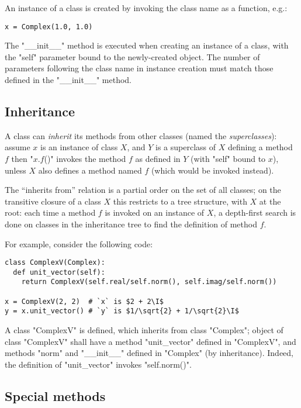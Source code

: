 {An instance of a class is created by invoking the class name as a
function, e.g.:
\begin{lstlisting}
x = Complex(1.0, 1.0)
\end{lstlisting}
The "__init__" method is executed when creating an instance of a
class, with the "self" parameter bound to the newly-created object.
The number of parameters following the class name in instance creation
must match those defined in the "__init__" method.

\subsection{Inheritance}
\label{sec:inheritance}

A class can \emph{inherit} its methods from other classes (named the
\emph{superclasses}): assume $x$ is an instance of class $X$, and $Y$ is a
superclass of $X$ defining a method $f$ then "$x$.$f$()" invokes the
method $f$ as defined in $Y$ (with "self" bound to $x$), unless $X$
also defines a method named $f$ (which would be invoked instead).

The ``inherits from'' relation is a partial order on the set of all
classes; on the transitive closure of a class $X$ this restricts to a
tree structure, with $X$ at the root: each time a method $f$ is
invoked on an instance of $X$, a depth-first search is done on classes
in the inheritance tree to find the definition of method $f$.

For example, consider the following code:
\begin{lstlisting}
class ComplexV(Complex):
  def unit_vector(self):
    return ComplexV(self.real/self.norm(), self.imag/self.norm())

x = ComplexV(2, 2)  # `x` is $2 + 2\I$
y = x.unit_vector() # `y` is $1/\sqrt{2} + 1/\sqrt{2}\I$
\end{lstlisting}
A class "ComplexV" is defined, which inherits from class
"Complex"; object of class "ComplexV" shall have a method
"unit_vector" defined in "ComplexV", and  methods "norm" and
"__init__" defined in "Complex" (by inheritance).  Indeed, the
definition of "unit_vector" invokes "self.norm()".

\subsection{Special methods}
\label{sec:special-methods}

}
